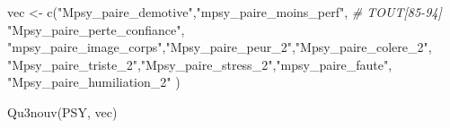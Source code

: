\documentclass[
]{article}
\newenvironment{Shaded}{\begin{snugshade}}{\end{snugshade}}
\newcommand{\CommentTok}[1]{\textcolor[rgb]{0.56,0.35,0.01}{\textit{#1}}}
\newcommand{\FunctionTok}[1]{\textcolor[rgb]{0.00,0.00,0.00}{#1}}
\newcommand{\NormalTok}[1]{#1}
\newcommand{\OtherTok}[1]{\textcolor[rgb]{0.56,0.35,0.01}{#1}}
\newcommand{\StringTok}[1]{\textcolor[rgb]{0.31,0.60,0.02}{#1}}
\begin{document}
\begin{Shaded}
\begin{Highlighting}[]
\NormalTok{vec }\OtherTok{\textless{}{-}} \FunctionTok{c}\NormalTok{(}\StringTok{"Mpsy\_paire\_demotive"}\NormalTok{,}\StringTok{"mpsy\_paire\_moins\_perf"}\NormalTok{,  }\CommentTok{\# TOUT[85{-}94]}
         \StringTok{"Mpsy\_paire\_perte\_confiance"}\NormalTok{,  }
    \StringTok{"mpsy\_paire\_image\_corps"}\NormalTok{,}\StringTok{"Mpsy\_paire\_peur\_2"}\NormalTok{,}\StringTok{"Mpsy\_paire\_colere\_2"}\NormalTok{,}
    \StringTok{"Mpsy\_paire\_triste\_2"}\NormalTok{,}\StringTok{"Mpsy\_paire\_stress\_2"}\NormalTok{,}\StringTok{"mpsy\_paire\_faute"}\NormalTok{,}
    \StringTok{"Mpsy\_paire\_humiliation\_2"}                                  
\NormalTok{     )}

\FunctionTok{Qu3nouv}\NormalTok{(PSY, vec)}
\end{Highlighting}
\end{Shaded}
\end{document}

